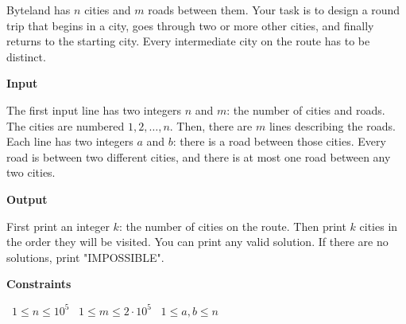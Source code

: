 Byteland has $n$ cities and $m$ roads between them. Your task is to design a round trip that begins in a city, goes through two or more other cities, and finally returns to the starting city. Every intermediate city on the route has to be distinct.

\vspace{0.3cm}\noindent\textbf{Input}

The first input line has two integers $n$ and $m$: the number of cities and roads. The cities are numbered $1,2,\dots,n$.
Then, there are $m$ lines describing the roads. Each line has two integers $a$ and $b$: there is a road between those cities.
Every road is between two different cities, and there is at most one road between any two cities.

\vspace{0.3cm}\noindent\textbf{Output}

First print an integer $k$: the number of cities on the route. Then print $k$ cities in the order they will be visited. You can print any valid solution.
If there are no solutions, print "IMPOSSIBLE".

\vspace{0.3cm}\noindent\textbf{Constraints}

\textbullet\ $1 \le n \le 10^5$
\textbullet\ $1 \le m \le 2 \cdot 10^5$
\textbullet\ $1 \le a,b \le n$